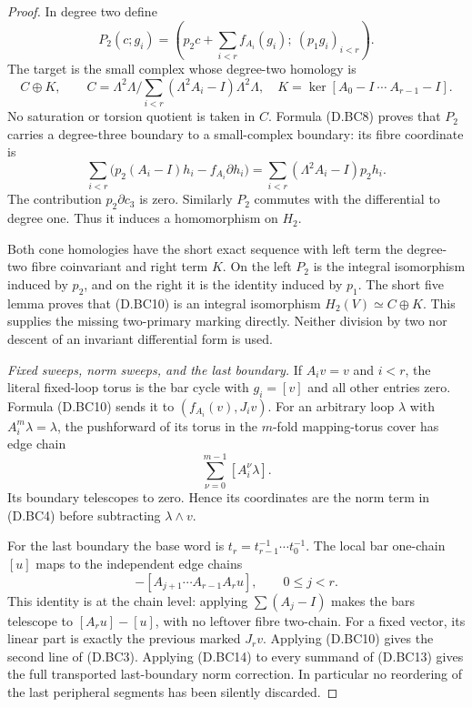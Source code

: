 \begin{proof}
In degree two define
\[
 P_2(c;g_i)=
 \left(p_2c+\sum_{i<r}f_{A_i}(g_i);\
                                  (p_1g_i)_{i<r}\right).
                                                        \tag{D.BC10}
\]
The target is the small complex whose degree-two
homology is
\[
 C\oplus K,\qquad
 C=\Lambda^2\Lambda/
          \sum_{i<r}(\Lambda^2A_i-I)\Lambda^2\Lambda,
 \quad
 K=\ker[A_0-I\ \cdots\ A_{r-1}-I].
                                                        \tag{D.BC11}
\]
No saturation or torsion quotient is taken in $C$.
Formula (D.BC8) proves that $P_2$ carries a
degree-three boundary to a small-complex boundary:
its fibre coordinate is
\[
 \sum_{i<r}\bigl(p_2(A_i-I)h_i-f_{A_i}\partial h_i\bigr)
       =\sum_{i<r}(\Lambda^2A_i-I)p_2h_i .
                                                        \tag{D.BC12}
\]
The contribution $p_2\partial c_3$ is zero.
Similarly $P_2$ commutes with the differential
to degree one. Thus it induces a homomorphism
on $H_2$.

Both cone homologies have the short exact
sequence with left term the degree-two fibre
coinvariant and right term $K$. On the left
$P_2$ is the integral isomorphism induced by
$p_2$, and on the right it is the identity
induced by $p_1$. The short five lemma proves
that (D.BC10) is an integral isomorphism
$H_2(V)\simeq C\oplus K$. This supplies the
missing two-primary marking directly. Neither
division by two nor descent of an invariant
differential form is used.

\emph{Fixed sweeps, norm sweeps, and the last boundary.}
If $A_i v=v$ and $i<r$, the literal fixed-loop
torus is the bar cycle with $g_i=[v]$ and
all other entries zero. Formula (D.BC10) sends
it to $(f_{A_i}(v),J_iv)$.
For an arbitrary loop $\lambda$ with
$A_i^m\lambda=\lambda$, the pushforward of
its torus in the $m$-fold mapping-torus cover
has edge chain
\[
                        \sum_{\nu=0}^{m-1}[A_i^\nu\lambda].
                                                        \tag{D.BC13}
\]
Its boundary telescopes to zero. Hence its
coordinates are the norm term in (D.BC4)
before subtracting $\lambda\wedge v$.

For the last boundary the base word is
$t_r=t_{r-1}^{-1}\cdots t_0^{-1}$.
The local bar one-chain $[u]$ maps to the
independent edge chains
\[
         -[A_{j+1}\cdots A_{r-1}A_ru],
                            \qquad 0\le j<r .
                                                        \tag{D.BC14}
\]
This identity is at the chain level: applying
$\sum(A_j-I)$ makes the bars telescope to
$[A_ru]-[u]$, with no leftover fibre two-chain.
For a fixed vector, its linear part is exactly
the previous marked $J_rv$. Applying
(D.BC10) gives the second line of (D.BC3).
Applying (D.BC14) to every summand of
(D.BC13) gives the full transported last-boundary
norm correction. In particular no reordering
of the last peripheral segments has been
silently discarded.


\end{proof}
